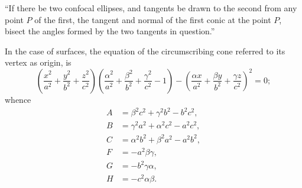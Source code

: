 \documentclass[11pt]{article}
\begin{document}
``If there be two confocal ellipses, and tangents be drawn to the second from any point $P$ of the first, the tangent and normal of the first conic at the point $P$, bisect the angles formed by the two tangents in question.''

\newpage
\setcounter{page}{258}

In the case of surfaces, the equation of the circumscribing cone referred to its vertex as origin, is
\[
\left(\frac{x^2}{a^2} + \frac{y^2}{b^2} + \frac{z^2}{c^2}\right)\!\!\left(\frac{\alpha^2}{a^2} + \frac{\beta^2}{b^2} + \frac{\gamma^2}{c^2} - 1\right) - \left(\frac{\alpha x}{a^2} + \frac{\beta y}{b^2} + \frac{\gamma z}{c^2}\right)^{\!2} = 0;
\]
whence
\begin{align*}
A &= \beta^2 c^2 + \gamma^2 b^2 - b^2 c^2,\\
B &= \gamma^2 a^2 + \alpha^2 c^2 - a^2 c^2,\\
C &= \alpha^2 b^2 + \beta^2 a^2 - a^2 b^2,\\
F &= -a^2\beta\gamma,\\
G &= -b^2\gamma\alpha,\\
H &= -c^2\alpha\beta.
\end{align*}
\end{document}
